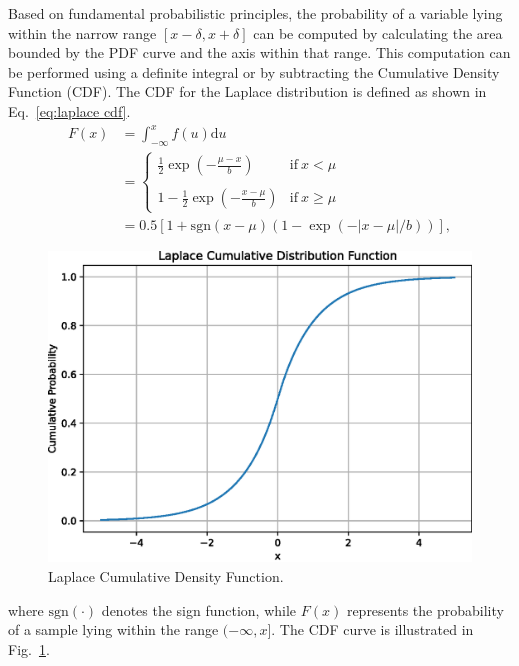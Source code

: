 \documentclass[journal]{IEEEtran}
\begin{document}
	Based on fundamental probabilistic principles, the probability of a variable lying within the narrow range $[x-\delta, x+\delta]$ can be computed by calculating the area bounded by the PDF curve and the axis within that range. This computation can be performed using a definite integral or by subtracting the Cumulative Density Function (CDF). The CDF for the Laplace distribution is defined as shown in Eq.~\eqref{eq:laplace cdf}.
	\begin{equation}\begin{aligned}
			F(x)& =\int_{-\infty}^xf(u)\mathrm{d}u  \\
			&=\begin{cases}\frac12\exp\left(-\frac{\mu-x}b\right)&\mathrm{if~}x<\mu\\
				\\1-\frac12\exp\left(-\frac{x-\mu}b\right)&\mathrm{if~}x\geq\mu\end{cases} \\
			&=0.5\left[1+\mathrm{sgn}(x-\mu)\left(1-\exp(-|x-\mu|/b)\right)\right], 
			\label{eq:laplace cdf}
	\end{aligned}\end{equation}
	\begin{figure}[!t]
		\centering
		\includegraphics[width=1.0\linewidth]{laplace_cdf.eps}
		\caption{Laplace Cumulative Density Function.}
		\label{fig:laplace distribution cdf}
	\end{figure}
	
	where $\mathrm{sgn}(\cdot)$ denotes the sign function, while $F(x)$ represents the probability of a sample lying within the range $(-\infty, x]$. The CDF curve is illustrated in Fig.~\ref{fig:laplace distribution cdf}.
	
\end{document}
